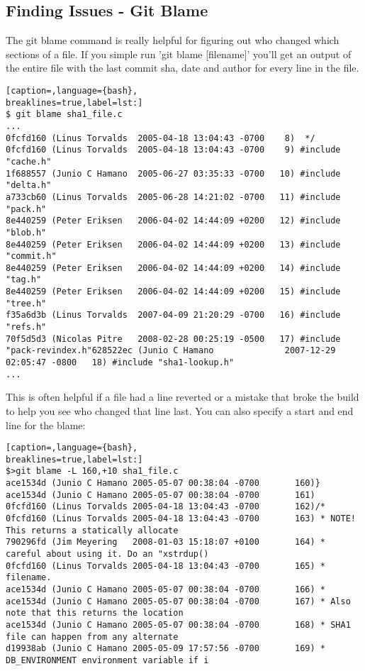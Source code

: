 \subsection{Finding Issues - Git Blame}
The git blame command is really helpful for figuring out who changed which
sections of a file. If you simple run 'git blame [filename]' you'll get an
output of the entire file with the last commit sha, date and author for every
line in the file.
\lstset{basicstyle=\scriptsize, numbers=none, captionpos=b, tabsize=4}
\begin{lstlisting}[caption=,language={bash},
breaklines=true,label=lst:]
$ git blame sha1_file.c
...
0fcfd160 (Linus Torvalds  2005-04-18 13:04:43 -0700    8)  */
0fcfd160 (Linus Torvalds  2005-04-18 13:04:43 -0700    9) #include "cache.h"
1f688557 (Junio C Hamano  2005-06-27 03:35:33 -0700   10) #include "delta.h"
a733cb60 (Linus Torvalds  2005-06-28 14:21:02 -0700   11) #include "pack.h"
8e440259 (Peter Eriksen   2006-04-02 14:44:09 +0200   12) #include "blob.h"
8e440259 (Peter Eriksen   2006-04-02 14:44:09 +0200   13) #include "commit.h"
8e440259 (Peter Eriksen   2006-04-02 14:44:09 +0200   14) #include "tag.h"
8e440259 (Peter Eriksen   2006-04-02 14:44:09 +0200   15) #include "tree.h"
f35a6d3b (Linus Torvalds  2007-04-09 21:20:29 -0700   16) #include "refs.h"
70f5d5d3 (Nicolas Pitre   2008-02-28 00:25:19 -0500   17) #include "pack-revindex.h"628522ec (Junio C Hamano              2007-12-29 02:05:47 -0800   18) #include "sha1-lookup.h"
...
\end{lstlisting}

This is often helpful if a file had a line reverted or a mistake that broke the
build to help you see who changed that line last.  You can also specify a start
and end line for the blame:
\lstset{basicstyle=\scriptsize, numbers=none, captionpos=b, tabsize=4}
\begin{lstlisting}[caption=,language={bash},
breaklines=true,label=lst:]
$>git blame -L 160,+10 sha1_file.c 
ace1534d (Junio C Hamano 2005-05-07 00:38:04 -0700       160)}
ace1534d (Junio C Hamano 2005-05-07 00:38:04 -0700       161)
0fcfd160 (Linus Torvalds 2005-04-18 13:04:43 -0700       162)/*
0fcfd160 (Linus Torvalds 2005-04-18 13:04:43 -0700       163) * NOTE! This returns a statically allocate
790296fd (Jim Meyering   2008-01-03 15:18:07 +0100       164) * careful about using it. Do an "xstrdup()
0fcfd160 (Linus Torvalds 2005-04-18 13:04:43 -0700       165) * filename.
ace1534d (Junio C Hamano 2005-05-07 00:38:04 -0700       166) *
ace1534d (Junio C Hamano 2005-05-07 00:38:04 -0700       167) * Also note that this returns the location
ace1534d (Junio C Hamano 2005-05-07 00:38:04 -0700       168) * SHA1 file can happen from any alternate 
d19938ab (Junio C Hamano 2005-05-09 17:57:56 -0700       169) * DB_ENVIRONMENT environment variable if i
\end{lstlisting}
